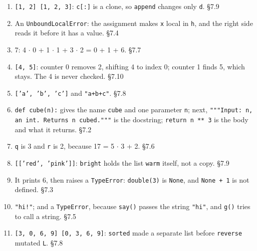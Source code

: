 \documentclass[11pt]{article}
\begin{document}
\begin{keepsection}
\begin{enumerate}
\item \texttt{[1, 2] [1, 2, 3]}: \texttt{c[:]} is a clone, so \texttt{append} changes only \texttt{d}. \hfill{\small\color{FAUblue}§7.9}
\item An \texttt{UnboundLocalError}: the assignment makes \texttt{x} local in \texttt{h}, and the right side reads it before it has a value. \hfill{\small\color{FAUblue}§7.4}
\item 7: 4 \ensuremath{\cdot} 0 + 1 \ensuremath{\cdot} 1 + 3 \ensuremath{\cdot} 2 = 0 + 1 + 6. \hfill{\small\color{FAUblue}§7.7}
\item \texttt{[4, 5]}: counter 0 removes 2, shifting 4 to index 0; counter 1 finds 5, which stays. The 4 is never checked. \hfill{\small\color{FAUblue}§7.10}
\item \texttt{['a', 'b', 'c']} and \texttt{"a+b+c"}. \hfill{\small\color{FAUblue}§7.8}
\item \texttt{def cube(n):} gives the name \texttt{cube} and one parameter \texttt{n}; next, \texttt{"""Input: n, an int. Returns n cubed."""} is the docstring; \texttt{return n ** 3} is the body and what it returns. \hfill{\small\color{FAUblue}§7.2}
\item \texttt{q} is 3 and \texttt{r} is 2, because 17 = 5 \ensuremath{\cdot} 3 + 2. \hfill{\small\color{FAUblue}§7.6}
\item \texttt{[['red', 'pink']]}: \texttt{bright} holds the list \texttt{warm} itself, not a copy. \hfill{\small\color{FAUblue}§7.9}
\item It prints 6, then raises a \texttt{TypeError}: \texttt{double(3)} is \texttt{None}, and \texttt{None + 1} is not defined. \hfill{\small\color{FAUblue}§7.3}
\item \texttt{"hi!"}; and a \texttt{TypeError}, because \texttt{say()} passes the string \texttt{"hi"}, and \texttt{g()} tries to call a string. \hfill{\small\color{FAUblue}§7.5}
\item \texttt{[3, 0, 6, 9] [0, 3, 6, 9]}: \texttt{sorted} made a separate list before \texttt{reverse} mutated \texttt{L}. \hfill{\small\color{FAUblue}§7.8}
\end{enumerate}

\end{keepsection}
\end{document}

